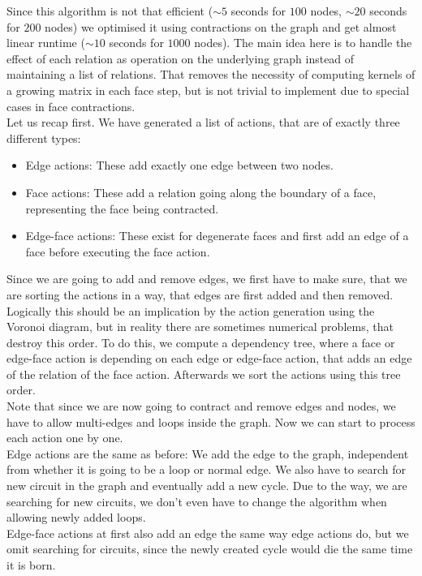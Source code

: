 \documentclass[11pt, a4paper, UKenglish]{article}
\begin{document}
    Since this algorithm is not that efficient ($\sim5$ seconds for $100$ nodes, $\sim20$ seconds for $200$ nodes) we optimised it using contractions on the graph and get almost linear runtime ($\sim10$ seconds for $1000$ nodes).
    The main idea here is to handle the effect of each relation as operation on the underlying graph instead of maintaining a list of relations.
    That removes the necessity of computing kernels of a growing matrix in each face step, but is not trivial to implement due to special cases in face contractions.\\
    Let us recap first.
    We have generated a list of actions, that are of exactly three different types:
    \begin{itemize}
        \item Edge actions: These add exactly one edge between two nodes.
        \item Face actions: These add a relation going along the boundary of a face, representing the face being contracted.
        \item Edge-face actions: These exist for degenerate faces and first add an edge of a face before executing the face action.
    \end{itemize}
    Since we are going to add and remove edges, we first have to make sure, that we are sorting the actions in a way, that edges are first added and then removed.
    Logically this should be an implication by the action generation using the Voronoi diagram, but in reality there are sometimes numerical problems, that destroy this order.
    To do this, we compute a dependency tree, where a face or edge-face action is depending on each edge or edge-face action, that adds an edge of the relation of the face action.
    Afterwards we sort the actions using this tree order.\\
    Note that since we are now going to contract and remove edges and nodes, we have to allow multi-edges and loops inside the graph.
    Now we can start to process each action one by one.\\
    Edge actions are the same as before: We add the edge to the graph, independent from whether it is going to be a loop or normal edge.
    We also have to search for new circuit in the graph and eventually add a new cycle.
    Due to the way, we are searching for new circuits, we don't even have to change the algorithm when allowing newly added loops.\\
    Edge-face actions at first also add an edge the same way edge actions do, but we omit searching for circuits, since the newly created cycle would die the same time it is born.
\end{document}
